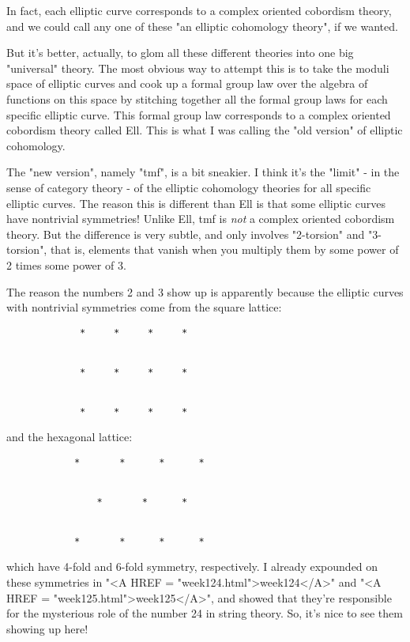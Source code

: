 In fact, each elliptic curve corresponds to a complex oriented 
cobordism theory, and we could call any one of these "an elliptic 
cohomology theory", if we wanted.

But it's better, actually, to glom all these different theories
into one big "universal" theory.  The most obvious way to attempt
this is to take the moduli space of elliptic curves and cook up 
a formal group law over the algebra of functions on this space 
by stitching together all the formal group laws for each specific 
elliptic curve.  This formal group law corresponds to a
complex oriented cobordism theory called Ell.  This is what 
I was calling the "old version" of elliptic cohomology. 

The "new version", namely "tmf", is a bit sneakier.  I think 
it's the "limit" - in the sense of category theory - of the 
elliptic cohomology theories for all specific elliptic curves.  
The reason this is different than Ell is that some elliptic 
curves have nontrivial symmetries!  Unlike Ell, tmf is \emph{not}
a complex oriented cobordism theory.  But the difference is 
very subtle, and only involves "2-torsion" and "3-torsion",
that is, elements that vanish when you multiply them by some
power of 2 times some power of 3.

The reason the numbers 2 and 3 show up is apparently because
the elliptic curves with nontrivial symmetries come from the 
square lattice:

\begin{verbatim}
             *     *     *     *


             *     *     *     *


             *     *     *     *
\end{verbatim}
    
and the hexagonal lattice:

\begin{verbatim}
            *       *      *      *


                *       *      *                


            *       *      *      *
\end{verbatim}
    
which have 4-fold and 6-fold symmetry, respectively.   I already 
expounded on these symmetries in "<A HREF = "week124.html">week124</A>" and "<A HREF = "week125.html">week125</A>", and showed 
that they're responsible for the mysterious role of the number 24 in 
string theory.  So, it's nice to see them showing up here!

